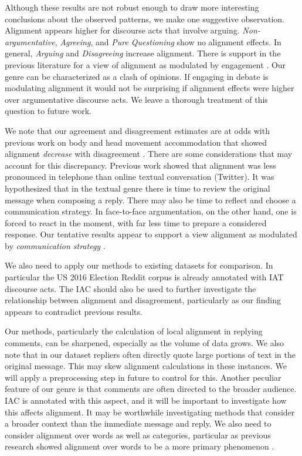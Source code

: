 \documentclass[11pt,a4paper]{article}
\begin{document}
Although these results are not robust enough to draw more interesting conclusions about the observed patterns, we make one suggestive observation. Alignment appears higher for discourse acts that involve arguing. \textit{Non-argumentative}, \textit{Agreeing}, and \textit{Pure Questioning} show no alignment effects. In general, \textit{Arguing} and \textit{Disagreeing} increase alignment. There is support in the previous literature for a view of  alignment as modulated by engagement \cite{NiederhofferP02}. Our genre can be characterized as a clash of opinions. If engaging in debate is modulating alignment it would not be surprising if alignment effects were higher over argumentative discourse acts. We leave a thorough treatment of this question to future work.

We note that our agreement and disagreement estimates are at odds with previous work on body and head movement accommodation that showed alignment \textit{decrease} with disagreement \cite{PaxtonD13, DuranF17}. There are some considerations that may account for this discrepancy. Previous work \cite{DoyleF16} showed that alignment was less pronounced in telephone than online textual conversation (Twitter). It was hypothesized that in the textual genre there is time to review the original message when composing a reply. There may also be time to reflect and choose a communication strategy. In face-to-face argumentation, on the other hand, one is forced to react in the moment, with far less time to prepare a considered response. Our tentative results appear to support a view alignment as modulated by \textit{communication strategy} \cite{FusaroliBORRFT12}.

We also need to apply our methods to existing datasets for comparison. In particular the US 2016 Election Reddit corpus \cite{VisserKDKBR19} is already annotated with IAT discourse acts. The IAC should also be used to further investigate the relationship between alignment and disagreement, particularly as our finding appears to contradict previous results.

Our methods, particularly the calculation of local alignment in replying comments, can be sharpened, especially as the volume of data grows. We also note that in our dataset repliers often directly quote large portions of text in the original message. This may skew alignment calculations in these instances. We will apply a preprocessing step in future to control for this. Another peculiar feature of our genre is that comments are often directed to the broader audience. IAC is annotated with this aspect, and it will be important to investigate how this affects alignment. It may be worthwhile investigating methods that consider a broader context than the immediate message and reply. We also need to consider alignment over words as well as categories, particular as previous research showed alignment over words to be a more primary phenomenon \cite{DoyleF16}.
\end{document}
